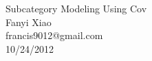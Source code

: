 \documentclass[11pt]{article}
\begin{document}
\medskip                        %

\begin{center}                  %
{\Large Subcategory Modeling Using Cov } \\
Fanyi Xiao \\
francis9012@gmail.com  \\
10/24/2012 \\
\end{center}




\end{document}
